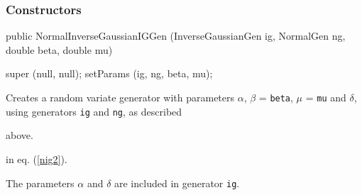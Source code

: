 \subsubsection* {Constructors}
\begin{code}

   public NormalInverseGaussianIGGen (InverseGaussianGen ig, NormalGen ng,
                                      double beta, double mu) \begin{hide} {
      super (null, null);
      setParams (ig, ng, beta, mu);
   }\end{hide}
\end{code} 
\begin{tabb}  Creates a \nig{} random variate generator with parameters
  $\alpha$, $\beta$ = \texttt{beta}, $\mu$ = \texttt{mu} and $\delta$,
 using generators  \texttt{ig} and \texttt{ng}, as described
\begin{htmlonly} above. \end{htmlonly}\begin{latexonly}
 in eq. (\ref{nig2}).\end{latexonly}
 The parameters $\alpha$ and $\delta$ are included in generator \texttt{ig}.
\end{tabb}


